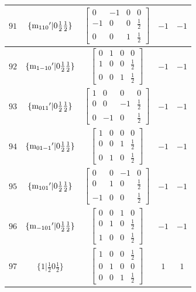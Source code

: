 \documentclass[fleqn,8pt]{jsarticle}
\begin{document}
\begin{longtable}{ccccc}
$ 91 $ & $ \{{\rm m}_{110}{}'|0 \frac{1}{2} \frac{1}{2}\} $ & $ \begin{bmatrix} 0 & -1 & 0 & 0 \\ -1 & 0 & 0 & \frac{1}{2} \\ 0 & 0 & 1 & \frac{1}{2} \end{bmatrix} $ & $ -1 $ & $ -1 $ \\ \hline
$ 92 $ & $ \{{\rm m}_{1-10}{}'|0 \frac{1}{2} \frac{1}{2}\} $ & $ \begin{bmatrix} 0 & 1 & 0 & 0 \\ 1 & 0 & 0 & \frac{1}{2} \\ 0 & 0 & 1 & \frac{1}{2} \end{bmatrix} $ & $ -1 $ & $ -1 $ \\ \hline
$ 93 $ & $ \{{\rm m}_{011}{}'|0 \frac{1}{2} \frac{1}{2}\} $ & $ \begin{bmatrix} 1 & 0 & 0 & 0 \\ 0 & 0 & -1 & \frac{1}{2} \\ 0 & -1 & 0 & \frac{1}{2} \end{bmatrix} $ & $ -1 $ & $ -1 $ \\ \hline
$ 94 $ & $ \{{\rm m}_{01-1}{}'|0 \frac{1}{2} \frac{1}{2}\} $ & $ \begin{bmatrix} 1 & 0 & 0 & 0 \\ 0 & 0 & 1 & \frac{1}{2} \\ 0 & 1 & 0 & \frac{1}{2} \end{bmatrix} $ & $ -1 $ & $ -1 $ \\ \hline
$ 95 $ & $ \{{\rm m}_{101}{}'|0 \frac{1}{2} \frac{1}{2}\} $ & $ \begin{bmatrix} 0 & 0 & -1 & 0 \\ 0 & 1 & 0 & \frac{1}{2} \\ -1 & 0 & 0 & \frac{1}{2} \end{bmatrix} $ & $ -1 $ & $ -1 $ \\ \hline
$ 96 $ & $ \{{\rm m}_{-101}{}'|0 \frac{1}{2} \frac{1}{2}\} $ & $ \begin{bmatrix} 0 & 0 & 1 & 0 \\ 0 & 1 & 0 & \frac{1}{2} \\ 1 & 0 & 0 & \frac{1}{2} \end{bmatrix} $ & $ -1 $ & $ -1 $ \\ \hline
$ 97 $ & $ \{1|\frac{1}{2} 0 \frac{1}{2}\} $ & $ \begin{bmatrix} 1 & 0 & 0 & \frac{1}{2} \\ 0 & 1 & 0 & 0 \\ 0 & 0 & 1 & \frac{1}{2} \end{bmatrix} $ & $ 1 $ & $ 1 $ \\ \hline

\end{longtable}
\end{document}
